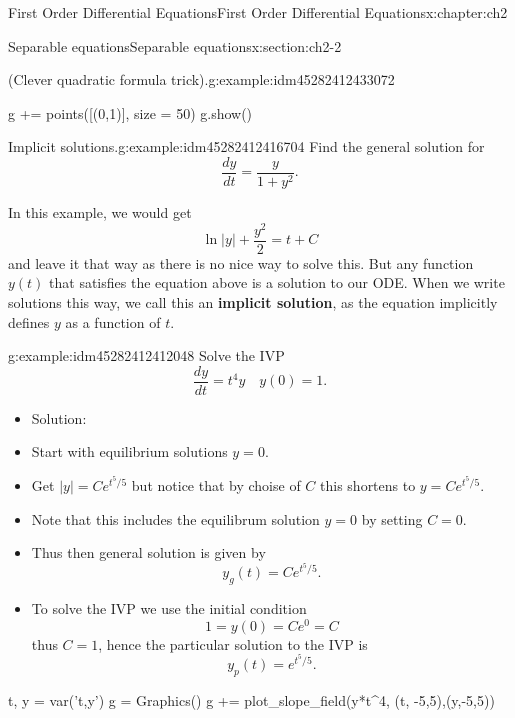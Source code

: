 \documentclass[oneside,10pt,]{book}
\newcommand{\terminology}[1]{\textbf{#1}}
\numberwithin{equation}{section}
\numberwithin{equation}{section}
\begin{document}
\begin{chapterptx}{First Order Differential Equations}{}{First Order Differential Equations}{}{}{x:chapter:ch2}
\begin{sectionptx}{Separable equations}{}{Separable equations}{}{}{x:section:ch2-2}
\begin{example}{(Clever quadratic formula trick).}{g:example:idm45282412433072}
\begin{sageinput}
g += points([(0,1)], size = 50)
g.show()
\end{sageinput}
\end{example}
\begin{example}{Implicit solutions.}{g:example:idm45282412416704}%
Find the general solution for%
\begin{equation*}
\frac{dy}{dt}=\frac{y}{1+y^{2}}.
\end{equation*}
%
\par
In this example, we would get%
\begin{equation*}
\ln\left|y\right|+\frac{y^{2}}{2}=t+C
\end{equation*}
and leave it that way as there is no nice way to solve this. But any function \(y(t)\) that satisfies the equation above is a solution to our ODE. When we write solutions this way, we call this an \terminology{implicit solution}, as the equation implicitly defines \(y\) as a function of \(t\).%
\end{example}
\begin{example}{}{g:example:idm45282412412048}%
Solve the IVP%
\begin{equation*}
\frac{dy}{dt}=t^{4}y\,\,\,\,\,\,y(0)=1.
\end{equation*}
%
%
\begin{itemize}[label=\textbullet]
\item{}Solution:%
\item{}Start with equilibrium solutions \(y=0\).%
\item{}Get \(\left|y\right|=Ce^{t^{5}/5}\) but notice that by choise of \(C\) this shortens to \(y=Ce^{t^{5}/5}\).%
\item{}Note that this includes the equilibrum solution \(y=0\) by setting \(C=0\).%
\item{}Thus then general solution is given by%
\begin{equation*}
y_g(t)=Ce^{t^{5}/5}.
\end{equation*}
%
\item{}To solve the IVP we use the initial condition%
\begin{equation*}
1=y(0)=Ce^{0}=C
\end{equation*}
thus \(C=1\), hence the particular solution to the IVP is%
\begin{equation*}
y_p(t)=e^{t^{5}/5}.
\end{equation*}
%
\end{itemize}
\begin{sageinput}
t, y = var('t,y')
g = Graphics()
g += plot_slope_field(y*t^4, (t, -5,5),(y,-5,5))

\end{sageinput}
\end{example}
\end{sectionptx}
\end{chapterptx}
\end{document}
